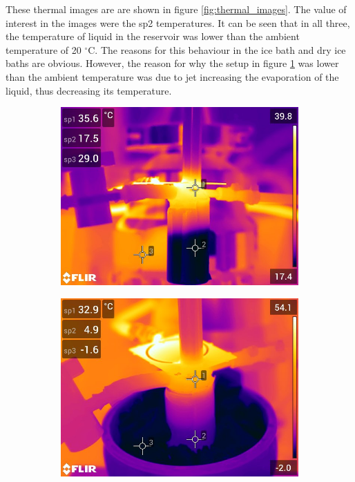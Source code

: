 These thermal images are are shown in figure \ref{fig:thermal_images}. The value of interest in the images were the sp2 temperatures. It can be seen that in all three, the temperature of liquid in the reservoir was lower than the ambient temperature of 20 $^{\circ}$C. The reasons for this behaviour in the ice bath and dry ice baths are obvious. However, the reason for why the setup in figure \ref{fig:thermal_ambient} was lower than the ambient temperature was due to jet increasing the evaporation of the liquid, thus decreasing its temperature.

\begin{figure}
    \centering
    \begin{subfigure}[b]{0.475\textwidth}
        \centering
        \includegraphics[width=\textwidth]{chapter_6/figures/thermal_ambient.jpg}
        \caption{}
        \label{fig:thermal_ambient}
    \end{subfigure}
    \hfill
    \begin{subfigure}[b]{0.475\textwidth}  
        \centering 
        \includegraphics[width=\textwidth]{chapter_6/figures/thermal_ice_bath.jpg}

\end{subfigure}
\end{figure}
